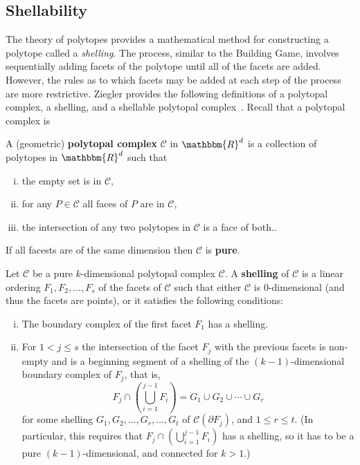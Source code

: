 \subsection{Shellability}
The theory of polytopes provides a mathematical method for constructing a polytope called a \textit{shelling}. The process, similar to the Building Game, involves sequentially adding facets of the polytope until all of the facets are added. However, the rules as to which facets may be added at each step of the process are more restrictive. Ziegler provides the following definitions of a polytopal complex, a shelling, and a shellable polytopal complex~\cite{Ziegler1995}. Recall that a polytopal complex is 
\begin{mydef}
\label{def:polycomp}
A (geometric) \textbf{polytopal complex} $\mathcal{C}$ in $\mathbbm{R}^d$ is a collection of polytopes in $\mathbbm{R}^d$ such that 
\begin{enumerate}[(i)]
\item the empty set is in $\mathcal{C}$,
\item for any $P \in \mathcal{C}$ all faces of $P$ are in $\mathcal{C}$,
\item the intersection of any two polytopes in $\mathcal{C}$ is a face of both..
\end{enumerate}
If all facests are of the same dimension then $\mathcal{C}$ is \textbf{pure}. 
\end{mydef}

\begin{mydef}
\label{def:shelling}
Let $\mathcal{C}$ be a pure $k$-dimensional polytopal complex $\mathcal{C}$. A \textbf{shelling} of $\mathcal{C}$ is a linear ordering $F_1,F_2,\dots,F_s$ of the facets of $\mathcal{C}$ such that either $\mathcal{C}$ is $0$-dimensional (and thus the facets are points), or it satisfies the following conditions:
\begin{enumerate}[(i)]
\item The boundary complex of the first facet $F_1$ has a shelling.
\item For $1 < j \leq s$ the intersection of the facet $F_j$ with the previous facets is non-empty and is a beginning segment of a shelling of the $(k-1)$-dimensional boundary complex of $F_j$, that is,
$$F_j \cap \left(\bigcup_{i=1}^{j-1}F_i\right) = G_1 \cup G_2 \cup \cdots \cup G_r$$
for some shelling $G_1, G_2, \dots, G_r, \dots, G_t$ of $\mathcal{C}(\partial F_j)$, and $1 \leq r \leq t$. (In particular, this requires that $F_j \cap (\bigcup_{i=1}^{j-1} F_i)$ has a shelling, so it has to be a pure $(k-1)$-dimensional, and connected for $k > 1$.)
\end{enumerate} 
\end{mydef}

